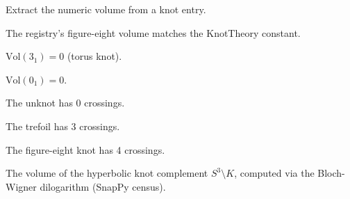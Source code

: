 \begin{definition}
  \label{def:volume-value}
  \leanok
  Extract the numeric volume from a knot entry.
\end{definition}

\begin{theorem}
  \label{thm:figure-eight-volume-consistent}
  \leanok
  The registry's figure-eight volume matches the KnotTheory constant.
\end{theorem}

\begin{theorem}
  \label{thm:trefoil-volume-zero}
  \leanok
  $\mathrm{Vol}(3_1) = 0$ (torus knot).
\end{theorem}

\begin{theorem}
  \label{thm:unknot-volume-zero}
  \leanok
  $\mathrm{Vol}(0_1) = 0$.
\end{theorem}

\begin{theorem}
  \label{thm:unknot-crossing-count}
  \leanok
  The unknot has 0 crossings.
\end{theorem}

\begin{theorem}
  \label{thm:trefoil-crossing-count}
  \leanok
  The trefoil has 3 crossings.
\end{theorem}

\begin{theorem}
  \label{thm:figure-eight-crossing-count}
  \leanok
  The figure-eight knot has 4 crossings.
\end{theorem}

\begin{definition}
  \label{def:hyperbolic-volume}
  The volume of the hyperbolic knot complement $S^3 \setminus K$,
  computed via the Bloch-Wigner dilogarithm (SnapPy census).
\end{definition}

